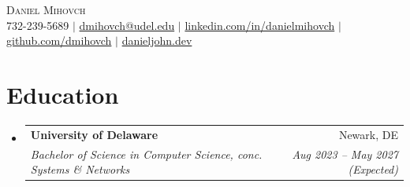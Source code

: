 \documentclass[11pt,a4paper]{article}
\makeatletter
\newcommand{\resumeHeading}[4]{
  \vspace{-2pt}\item
    \begin{tabular*}{0.97\textwidth}[t]{l@{\extracolsep{\fill}}r}
      \textbf{#1} & #2 \\
      \textit{\small#3} & \textit{\small #4} \\
    \end{tabular*}\vspace{-7pt}
}
\makeatother
\begin{document}
\begin{center}
    {\Huge \scshape Daniel Mihovch} \\ \vspace{5pt}
    \small 732-239-5689 $|$
    \href{mailto:dmihovch@udel.edu}{dmihovch@udel.edu} $|$
    \href{https://linkedin.com/in/danielmihovch}{linkedin.com/in/danielmihovch} $|$
    \href{https://github.com/dmihovch}{github.com/dmihovch} $|$
    \href{https://danieljohn.dev}{danieljohn.dev}
\end{center}

\section{Education}
\begin{itemize}[leftmargin=0.15in, label={}]
    \resumeHeading
      {University of Delaware}{Newark, DE}
      {Bachelor of Science in Computer Science, conc. Systems \& Networks}{Aug 2023 -- May 2027 (Expected)}
\end{itemize}

\end{document}
